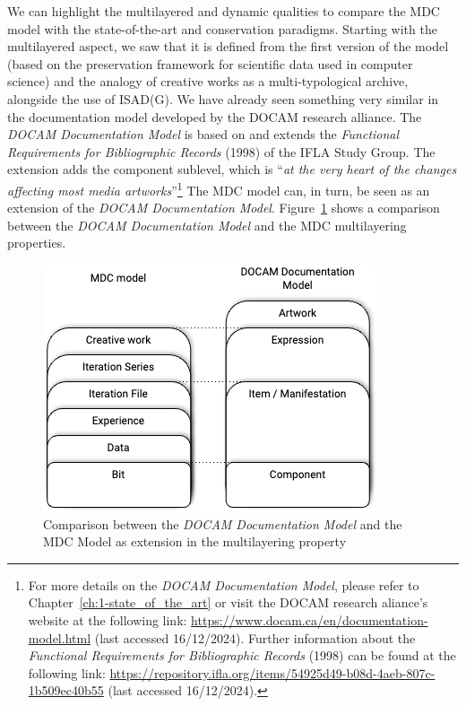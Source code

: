 We can highlight the multilayered and dynamic qualities to compare the MDC model with the state-of-the-art and conservation paradigms. Starting with the multilayered aspect, we saw that it is defined from the first version of the model (based on the preservation framework for scientific data used in computer science) and the analogy of creative works as a multi-typological archive, alongside the use of ISAD(G). We have already seen something very similar in the documentation model developed by the DOCAM research alliance. The \textit{DOCAM Documentation Model} is based on and extends the \textit{Functional Requirements for Bibliographic Records} (1998) \cite{plassard1998functional} of the IFLA Study Group. The extension adds the component sublevel, which is ``\textit{at the very heart of the changes affecting most media artworks}''\footnote{For more details on the \textit{DOCAM Documentation Model}, please refer to Chapter~\ref{ch:1-state_of_the_art} or visit the DOCAM research aliance's website at the following link: \url{https://www.docam.ca/en/documentation-model.html} (last accessed 16/12/2024). Further information about the \textit{Functional Requirements for Bibliographic Records} (1998) can be found at the following link: \url{https://repository.ifla.org/items/54925d49-b08d-4aeb-807c-1b509ec40b55} (last accessed 16/12/2024).} The MDC model can, in turn, be seen as an extension of the \textit{DOCAM Documentation Model}. Figure~\ref{fig:c3-mdc-docam} shows a comparison between the \textit{DOCAM Documentation Model} and the MDC multilayering properties.

\begin{figure}[!h]
    \centering
    \includegraphics[width=0.5\linewidth]{chapters/3-mdc_model-reactivation_workflow-instruction_template/image/graph03-mdc-docam.png}
    \caption{Comparison between the \textit{DOCAM Documentation Model} and the MDC Model as extension in the multilayering property}
    \label{fig:c3-mdc-docam}
\end{figure}

